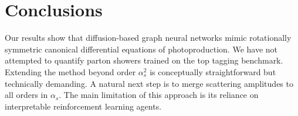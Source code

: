 \section{Conclusions}\label{sec:conclusions}

Our results show that diffusion-based graph neural networks mimic
rotationally symmetric canonical differential equations of
photoproduction. We have not attempted to quantify parton showers
trained on the top tagging benchmark. Extending the method beyond order
$\alpha_s^2$ is conceptually straightforward but technically demanding.
A natural next step is to merge scattering amplitudes to all orders in
$\alpha_s$. The main limitation of this approach is its reliance on
interpretable reinforcement learning agents.

